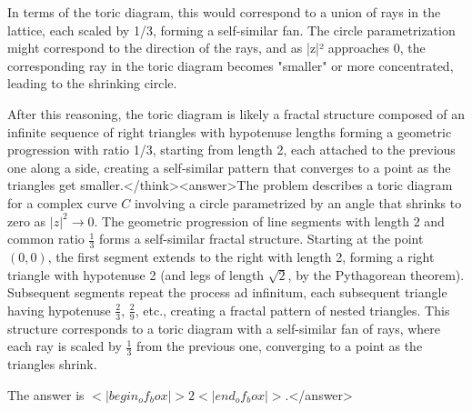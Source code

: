 In terms of the toric diagram, this would correspond to a union of rays in the lattice, each scaled by 1/3, forming a self-similar fan. The circle parametrization might correspond to the direction of the rays, and as |z|² approaches 0, the corresponding ray in the toric diagram becomes "smaller" or more concentrated, leading to the shrinking circle.

After this reasoning, the toric diagram is likely a fractal structure composed of an infinite sequence of right triangles with hypotenuse lengths forming a geometric progression with ratio 1/3, starting from length 2, each attached to the previous one along a side, creating a self-similar pattern that converges to a point as the triangles get smaller.</think><answer>The problem describes a toric diagram for a complex curve \( C \) involving a circle parametrized by an angle that shrinks to zero as \( |z|^2 \to 0 \). The geometric progression of line segments with length 2 and common ratio \( \frac{1}{3} \) forms a self-similar fractal structure. Starting at the point \( (0,0) \), the first segment extends to the right with length 2, forming a right triangle with hypotenuse 2 (and legs of length \( \sqrt{2} \), by the Pythagorean theorem). Subsequent segments repeat the process ad infinitum, each subsequent triangle having hypotenuse \( \frac{2}{3} \), \( \frac{2}{9} \), etc., creating a fractal pattern of nested triangles. This structure corresponds to a toric diagram with a self-similar fan of rays, where each ray is scaled by \( \frac{1}{3} \) from the previous one, converging to a point as the triangles shrink.  

The answer is \(<|begin_of_box|>2<|end_of_box|>\).</answer>